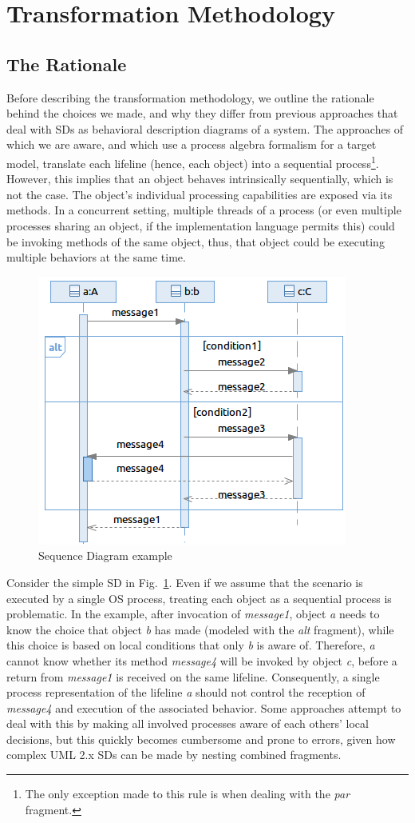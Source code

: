 \documentclass[letter]{llncs}
\newcommand{\figshrink}{\vspace{-.6cm}}
\newcommand{\figshrinkend}{}
\newcommand{\secshrink}{\vspace{-.5cm}}
\newcommand{\secshrinkbegin}{\vspace{-.2cm}}
\newcommand{\subsecshrinkbegin}{\vspace{-.2cm}}
\begin{document}
\secshrink
\section{Transformation Methodology}
\label{sec:Methodology}
\secshrinkbegin
\subsection{The Rationale}
\subsecshrinkbegin
Before describing the transformation methodology, we outline the rationale behind the choices we made, and why they differ from previous approaches
that deal with SDs as behavioral description diagrams of a system. 
The approaches of which we are aware, and which use a process algebra formalism for a target model, translate each lifeline (hence, each object) into a 
sequential process\footnote{The only exception made to this rule is when dealing with the \emph{par} fragment.}. However, this implies that an object 
behaves intrinsically sequentially, which is not the case. The object's individual processing capabilities are exposed via its methods. 
In a concurrent setting, multiple threads of a process (or even multiple processes sharing an object, if the implementation language permits this) 
could be invoking methods of the same object, thus, that object could be executing multiple behaviors at the same time.
\begin{figure}[!t]
\centering
\figshrink
\includegraphics[width=0.5\linewidth,keepaspectratio=true]{./Figure4_new.png}
\caption{Sequence Diagram example}
\label{fig:counterExample}
\figshrinkend
\end{figure}
Consider the simple SD in Fig.~\ref{fig:counterExample}. 
Even if we assume that the scenario is executed by a single OS process, treating 
each object as a sequential process is problematic. In the example, after invocation of \emph{message1}, object \emph{a}
needs to know the choice that object \emph{b} has made (modeled with the \emph{alt} fragment), while this choice is based on local conditions that only \emph{b} is aware of. Therefore, \emph{a}
cannot know whether its method \emph{message4} will be invoked by object \emph{c}, before a return from \emph{message1} is received on the same lifeline.
Consequently, a single process representation of the lifeline \emph{a} should not control the reception of \emph{message4} and execution of the associated behavior.
Some approaches attempt to deal with this by making all involved processes aware of each others' local decisions, but this quickly becomes cumbersome and prone to errors, given
how complex UML 2.x SDs can be made by nesting combined fragments.
\end{document}
